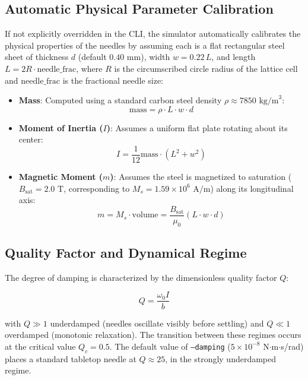 \documentclass[11pt,a4paper]{article}
\newcommand{\code}[1]{\texttt{#1}}
\begin{document}
\subsection{Automatic Physical Parameter Calibration}
If not explicitly overridden in the CLI, the simulator automatically calibrates the physical properties of the needles by assuming each is a flat rectangular steel sheet of thickness $d$ (default $0.40\text{ mm}$), width $w = 0.22\,L$, and length $L = 2R \cdot \text{needle\_frac}$, where $R$ is the circumscribed circle radius of the lattice cell and $\text{needle\_frac}$ is the fractional needle size:
\begin{itemize}
    \item \textbf{Mass}: Computed using a standard carbon steel density $\rho \approx 7850\text{ kg/m}^3$:
    \begin{equation}
    \text{mass} = \rho \cdot L \cdot w \cdot d
    \end{equation}
    \item \textbf{Moment of Inertia ($I$)}: Assumes a uniform flat plate rotating about its center:
    \begin{equation}
    I = \frac{1}{12} \text{mass} \cdot (L^2 + w^2)
    \end{equation}
    \item \textbf{Magnetic Moment ($m$)}: Assumes the steel is magnetized to saturation ($B_{\text{sat}} = 2.0\text{ T}$, corresponding to $M_s = 1.59 \times 10^6\text{ A/m}$) along its longitudinal axis:
    \begin{equation}
    m = M_s \cdot \text{volume} = \frac{B_{\text{sat}}}{\mu_0} (L \cdot w \cdot d)
    \end{equation}
\end{itemize}

\subsection{Quality Factor and Dynamical Regime}
The degree of damping is characterized by the dimensionless quality factor $Q$:

\begin{equation}
Q = \frac{\omega_0 I}{b}
\end{equation}

\noindent
with $Q \gg 1$ underdamped (needles oscillate visibly before settling) and $Q \ll 1$ overdamped (monotonic relaxation). The transition between these regimes occurs at the critical value $Q_c = 0.5$. The default value of \code{--damping} ($5 \times 10^{-8}$ N$\cdot$m$\cdot$s/rad) places a standard tabletop needle at $Q \approx 25$, in the strongly underdamped regime.
\end{document}
